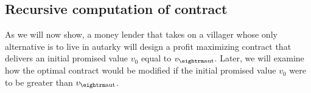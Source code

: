 
\subsection{Recursive computation of contract}\label{recursive_comp_cont}%
As we will now show, a money lender that takes on a villager whose only alternative is to live in autarky will design a profit maximizing contract that delivers an initial promised value $v_0$ equal to $v_{\rm aut}$. Later, we will examine how the optimal contract would be modified if the initial promised value $v_0$ were to be greater than $v_{\rm aut}$.

